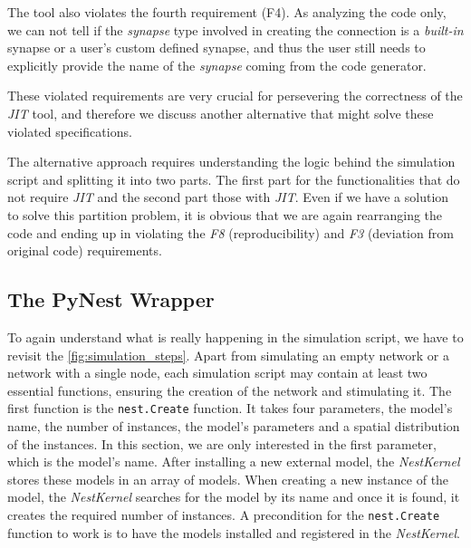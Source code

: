 
The tool also violates the fourth requirement (F4). As analyzing the code only, we can not tell if the \emph{synapse} type involved in creating the connection is a \emph{built-in} synapse or a user's custom defined synapse, and thus the user still  needs to explicitly provide the name of the \emph{synapse} coming from the code generator. 

These violated requirements are very crucial for persevering the correctness of the \emph{JIT} tool, and therefore we discuss  another alternative that might solve these violated specifications.


The alternative approach requires understanding the logic behind the simulation script and splitting it into two parts. The first part for the functionalities that do not require \emph{JIT} and the second part those with \emph{JIT}. Even if we have a solution to solve this partition problem, it is obvious that we are again rearranging the code and ending up in violating the \emph{F8} (reproducibility) and \emph{F3} (deviation from original code) requirements.

\subsection{The PyNest Wrapper}

To again understand what is really happening in the simulation script, we have to revisit the \autoref{fig:simulation_steps}. Apart from simulating an empty network or a network with a single node, each simulation script may contain at least two essential functions, ensuring the creation of the network and stimulating it. The first function is the \texttt{nest.Create} function. It takes four parameters, the model's name, the number of instances, the model's parameters and a spatial distribution of the instances. In this section, we are only interested in the first parameter, which is the model's name. After installing a new external model, the \emph{NestKernel} stores these models in an array of models. When creating a new instance of the model, the \emph{NestKernel} searches for the model by its name and once it is found, it creates the required number of instances. A precondition for the \texttt{nest.Create} function to work is to have the models installed and registered in the \emph{NestKernel}.


